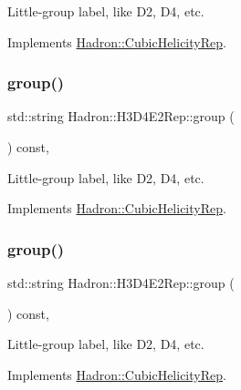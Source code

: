 Little-\/group label, like D2, D4, etc. 

Implements \mbox{\hyperlink{structHadron_1_1CubicHelicityRep_a101a7d76cd8ccdad0f272db44b766113}{Hadron\+::\+Cubic\+Helicity\+Rep}}.

\mbox{\label{structHadron_1_1H3D4E2Rep_acfd57e0a45fce51a748dfe354f357e8a}} 
\subsubsection{\texorpdfstring{group()}{group()}\hspace{0.1cm}{\footnotesize\ttfamily [3/5]}}
{\footnotesize\ttfamily std\+::string Hadron\+::\+H3\+D4\+E2\+Rep\+::group (\begin{DoxyParamCaption}{ }\end{DoxyParamCaption}) const\hspace{0.3cm}{\ttfamily [inline]}, {\ttfamily [virtual]}}

Little-\/group label, like D2, D4, etc. 

Implements \mbox{\hyperlink{structHadron_1_1CubicHelicityRep_a101a7d76cd8ccdad0f272db44b766113}{Hadron\+::\+Cubic\+Helicity\+Rep}}.

\mbox{\label{structHadron_1_1H3D4E2Rep_acfd57e0a45fce51a748dfe354f357e8a}} 
\subsubsection{\texorpdfstring{group()}{group()}\hspace{0.1cm}{\footnotesize\ttfamily [4/5]}}
{\footnotesize\ttfamily std\+::string Hadron\+::\+H3\+D4\+E2\+Rep\+::group (\begin{DoxyParamCaption}{ }\end{DoxyParamCaption}) const\hspace{0.3cm}{\ttfamily [inline]}, {\ttfamily [virtual]}}

Little-\/group label, like D2, D4, etc. 

Implements \mbox{\hyperlink{structHadron_1_1CubicHelicityRep_a101a7d76cd8ccdad0f272db44b766113}{Hadron\+::\+Cubic\+Helicity\+Rep}}.

\mbox{\label{structHadron_1_1H3D4E2Rep_acfd57e0a45fce51a748dfe354f357e8a}} 
